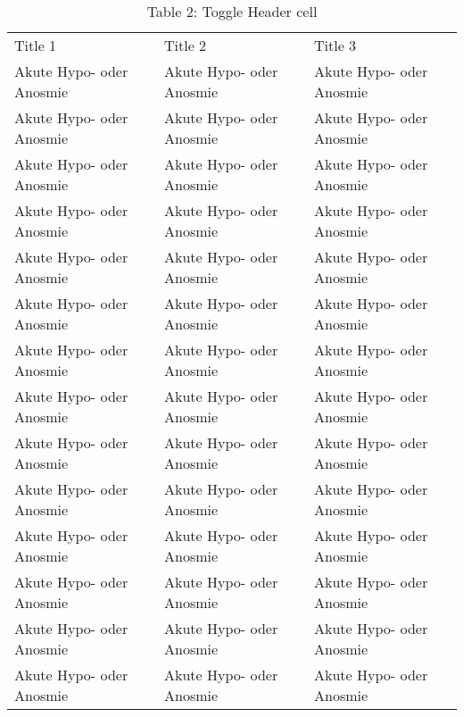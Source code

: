 \documentclass{article}
\begin{document}
\begin{table}
\caption*{Table 2: Toggle Header cell}\label{T14813741}

\begin{tabu} to \textwidth { |X|X|X| }
\hline



Title 1 & Title 2 & Title 3
 \\


Akute Hypo- oder Anosmie & Akute Hypo- oder Anosmie & Akute Hypo- oder Anosmie
 \\


Akute Hypo- oder Anosmie & Akute Hypo- oder Anosmie & Akute Hypo- oder Anosmie
 \\


Akute Hypo- oder Anosmie & Akute Hypo- oder Anosmie & Akute Hypo- oder Anosmie
 \\


Akute Hypo- oder Anosmie & Akute Hypo- oder Anosmie & Akute Hypo- oder Anosmie
 \\


Akute Hypo- oder Anosmie & Akute Hypo- oder Anosmie & Akute Hypo- oder Anosmie
 \\


Akute Hypo- oder Anosmie & Akute Hypo- oder Anosmie & Akute Hypo- oder Anosmie
 \\


Akute Hypo- oder Anosmie & Akute Hypo- oder Anosmie & Akute Hypo- oder Anosmie
 \\


Akute Hypo- oder Anosmie & Akute Hypo- oder Anosmie & Akute Hypo- oder Anosmie
 \\


Akute Hypo- oder Anosmie & Akute Hypo- oder Anosmie & Akute Hypo- oder Anosmie
 \\


Akute Hypo- oder Anosmie & Akute Hypo- oder Anosmie & Akute Hypo- oder Anosmie
 \\


Akute Hypo- oder Anosmie & Akute Hypo- oder Anosmie & Akute Hypo- oder Anosmie
 \\


Akute Hypo- oder Anosmie & Akute Hypo- oder Anosmie & Akute Hypo- oder Anosmie
 \\


Akute Hypo- oder Anosmie & Akute Hypo- oder Anosmie & Akute Hypo- oder Anosmie
 \\


Akute Hypo- oder Anosmie & Akute Hypo- oder Anosmie & Akute Hypo- oder Anosmie
 \\



\end{tabu}
\end{table}
\end{document}
